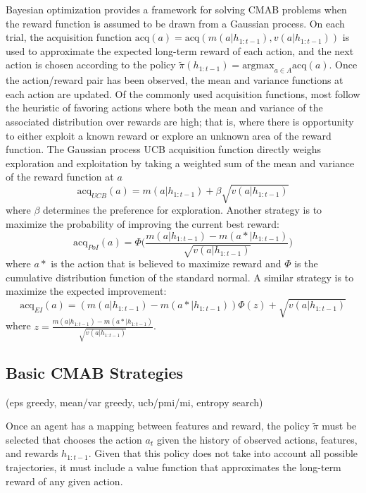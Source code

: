 \documentclass[10pt,letterpaper]{article}
\begin{document}
	Bayesian optimization \citep{Snoek} provides a framework for solving CMAB problems when the reward function is assumed to be drawn from a Gaussian process. On each trial, the acquisition function $\text{acq}(a) = \text{acq}(m(a|h_{1:t-1}), v(a|h_{1:t-1}))$ is used to approximate the expected long-term reward of each action, and the next action is chosen according to the policy $\tilde{\pi}(h_{1:t-1}) = \text{argmax}_{a \in A}\text{acq}(a)$. Once the action/reward pair has been observed, the mean and variance functions at each action are updated. Of the commonly used acquisition functions, most follow the heuristic of favoring actions where both the mean and variance of the associated distribution over rewards are high; that is, where there is opportunity to either exploit a known reward or explore an unknown area of the reward function. The Gaussian process UCB acquisition function directly weighs exploration and exploitation by taking a weighted sum of the mean and variance of the reward function at $a$ 
	\begin{equation}
	\text{acq}_{UCB}(a) = m(a|h_{1:t-1}) + \beta \sqrt{v(a|h_{1:t-1})}
	\end{equation}
	where $\beta$ determines the preference for exploration. Another strategy is to maximize the probability of improving the current best reward:
	\begin{equation}
	\text{acq}_{PoI}(a) = \Phi \bigg( \frac{m(a|h_{1:t-1}) -  m(a*|h_{1:t-1})}{\sqrt{v(a|h_{1:t-1})}} \bigg)
	\end{equation}
	where $a*$ is the action that is believed to maximize reward and $\Phi$ is the cumulative distribution function of the standard normal. A similar strategy is to maximize the expected improvement:
	\begin{equation}
	\text{acq}_{EI}(a) = (m(a|h_{1:t-1}) -  m(a*|h_{1:t-1})) \Phi(z) + \sqrt{v(a|h_{1:t-1})}
	\end{equation}
	where $z = \frac{m(a|h_{1:t-1}) -  m(a*|h_{1:t-1})}{\sqrt{v(a|h_{1:t-1})}}$.
	
	\subsection{Basic CMAB Strategies}
	
	(eps greedy, mean/var greedy, ucb/pmi/mi, entropy search)
	
	Once an agent has a mapping between features and reward, the policy $\tilde{\pi}$ must be selected that chooses the action $a_{t}$ given the history of observed actions, features, and rewards $h_{1:t-1}$. Given that this policy does not take into account all possible trajectories, it must include a value function that approximates the long-term reward of any given action.
	
\end{document}
